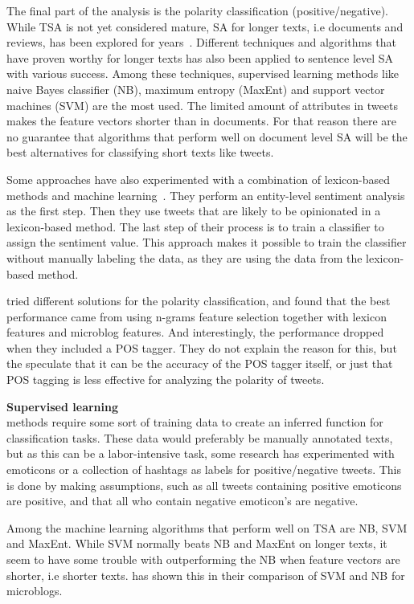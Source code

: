 The final part of the analysis is the polarity classification (positive/negative). While TSA is not yet considered mature, SA for longer texts, i.e documents and reviews, has been explored for years~\citep{book:pang}. Different techniques and algorithms that have proven worthy for longer texts has also been applied to sentence level SA with various success. Among these techniques, supervised learning methods like naive Bayes classifier (NB), maximum entropy (MaxEnt) and support vector machines (SVM) are the most used. The limited amount of attributes in tweets makes the feature vectors shorter than in documents. For that reason there are no guarantee that algorithms that perform well on document level SA will be the best alternatives for classifying short texts like tweets.

Some approaches have also experimented with a combination of lexicon-based methods and  machine learning~\citep{article:mudinas}. They perform an entity-level sentiment analysis as the first step. Then they use tweets that are likely to be opinionated in a lexicon-based method. The last step of their process is to train a classifier to assign the sentiment value. This approach makes it possible to train the classifier without manually labeling the data, as they are using the data from the lexicon-based method.

\cite{article:omg} tried different solutions for the polarity classification, and found that the best performance came from using n-grams feature selection together with lexicon features and microblog features. And interestingly, the performance dropped when they included a POS tagger. They do not explain the reason for this, but the speculate that it can be the accuracy of the POS tagger itself, or just that POS tagging is less effective for analyzing the polarity of tweets.\vspace{8mm}

\noindent
\textbf{Supervised learning} \\
\noindent
methods require some sort of training data to create an inferred function for classification tasks. These data would preferably be manually annotated texts, but as this can be a labor-intensive task, some research has experimented with emoticons or a collection of hashtags as labels for positive/negative tweets. This is done by making assumptions, such as all tweets containing positive emoticons are positive, and that all who contain negative emoticon’s are negative.

Among the machine learning algorithms that perform well on TSA are NB, SVM and MaxEnt. While SVM normally beats NB and MaxEnt on longer texts, it seem to have some trouble with outperforming the NB when feature vectors are shorter, i.e shorter texts. \cite{article:bermingham} has shown this in their comparison of SVM and NB for microblogs.\vspace{8 mm}

